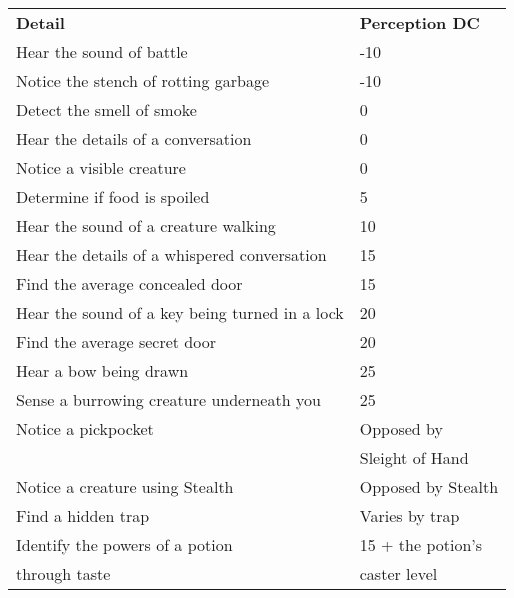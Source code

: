 \begin{table}
\sffamily
 \begin{tabular}{ll}
\textbf{Detail} & \textbf{Perception DC}\\
Hear the sound of battle & -10\\
Notice the stench of rotting garbage & -10\\
Detect the smell of smoke & 0\\
Hear the details of a conversation & 0\\
Notice a visible creature &0\\
Determine if food is spoiled & 5\\
Hear the sound of a creature walking & 10\\
Hear the details of a whispered conversation & 15\\
Find the average concealed door& 15\\
Hear the sound of a key being turned in a lock & 20\\
Find the average secret door & 20\\
Hear a bow being drawn & 25\\
Sense a burrowing creature underneath you & 25\\
Notice a pickpocket & Opposed by  \\
                    & Sleight of Hand\\
Notice a creature using Stealth & Opposed by Stealth\\
Find a hidden trap &Varies by trap\\
Identify the powers of a potion & 15 + the potion's \\
through taste                   &  caster level\\ 
 \end{tabular}

\end{table}
